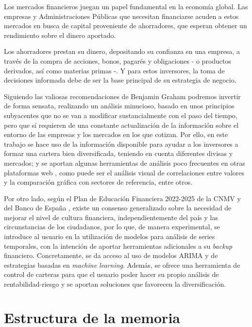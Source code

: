 
Los mercados financieros juegan un papel fundamental en la economía global. 
Las empresas y Administraciones Públicas que necesitan financiarse acuden a 
estos mercados en busca de capital proveniente de ahorradores, que esperan 
obtener un rendimiento sobre el dinero aportado. 

Los ahorradores prestan su dinero, depositando su confianza en una empresa,
 a través de la compra de acciones, bonos, pagarés y obligaciones - o productos
 derivados, así como materias primas -. Y para estos inversores, la toma de 
 decisiones informada debe de ser la base principal de su estrategia de negocio. 

Siguiendo las valiosas recomendaciones de Benjamin Graham \citep{book:Inversor_inteligente}
 podremos invertir de forma sensata, realizando un análisis minucioso, basado 
 en unos principios subyacentes que no se van a modificar sustancialmente con 
 el paso del tiempo, pero que sí requieren de una constante actualización de 
 la información sobre el entorno de las empresas y los mercados en los que 
 cotizan. Por ello, en este trabajo se hace uso de la información disponible 
 para ayudar a los inversores a formar una cartera bien diversificada, teniendo 
 en cuenta diferentes divisas y mercados; y se aportan algunas herramientas de 
 análisis poco frecuentes en otras plataformas web \citep{online:MarketScreener,online:Investing,online:Bloomberg}, 
 como puede ser el análisis visual de correlaciones entre valores y la 
 comparación gráfica con sectores de referencia, entre otros. 
 
Por otro lado, según el Plan de Educación Financiera 2022-2025 \citep{report:cnmv_informe} 
 de la CNMV \citep{online:cnmv_portal} y del Banco de España \citep{online:bde}, existe un consenso 
 generalizado sobre la necesidad de mejorar el nivel de cultura financiera, 
 independientemente del país y las circunstancias de los ciudadanos, por lo que, de 
 manera experimental, se introduce al usuario en la utilización de modelos para análisis 
 de series temporales, con la intención de aportar herramientas adicionales a su \textit{backup} 
 financiero. Concretamente, se da acceso al uso de modelos ARIMA \citep{wiki:ARIMA} 
 y de estrategias basadas en \emph{machine learning}. Además, se ofrece una herramienta de control de carteras para que el usuario poder hacer su propio análisis de rentabilidad-riesgo y se aportan soluciones que favorecen la diversificación. 


\section{Estructura de la memoria}\label{estructura-de-la-memoria}

